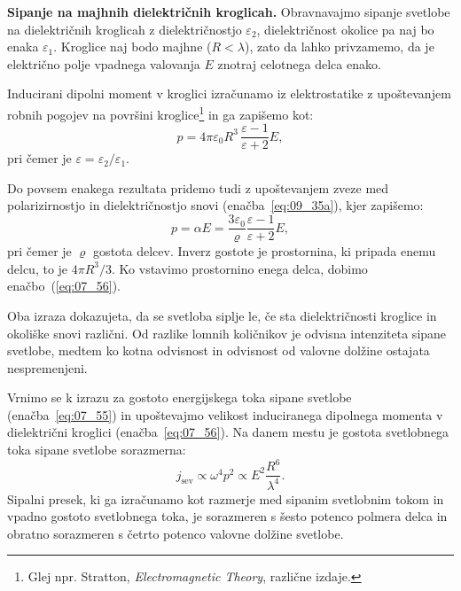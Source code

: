 \begin{example}{\bf Sipanje na majhnih dielektričnih kroglicah.}
Obravnavajmo sipanje svetlobe na dielektričnih kroglicah z
dielektričnostjo $\varepsilon_2$, dielektričnost 
okolice pa naj bo enaka $\varepsilon_1$. Kroglice naj bodo majhne ($R < \lambda$),
zato da lahko privzamemo, da je električno polje 
vpadnega valovanja $E$ znotraj celotnega delca enako. 

Inducirani dipolni moment v kroglici izračunamo iz 
elektrostatike z upoštevanjem robnih pogojev na površini 
kroglice\footnote{Glej npr. Stratton, {\it Electromagnetic Theory}, različne izdaje.}
in ga zapišemo kot:
\begin{equation}
p = 4 \pi \varepsilon_0 R^3 \,\frac{\varepsilon-1}{\varepsilon +2} E,
\label{eq:07_56}
\end{equation}
pri čemer je $\varepsilon = \varepsilon_2/\varepsilon_1$. 

Do povsem enakega rezultata pridemo tudi z upoštevanjem zveze med polarizirnostjo in 
dielektričnostjo snovi (enačba~\ref{eq:09_35a}), kjer zapišemo:
\begin{equation}
p = \alpha E = \frac{3\varepsilon_0}{\varrho}\frac{\varepsilon-1}{\varepsilon+2}E,
\label{eq:07_57}
\end{equation}
pri čemer je $\varrho$ gostota delcev. Inverz gostote je prostornina, ki pripada
enemu delcu, to je $4\pi R^3/3$. Ko vstavimo prostornino enega delca, dobimo enačbo~(\ref{eq:07_56}).

Oba izraza dokazujeta, da se svetloba siplje le, če sta dielektričnosti 
kroglice in okoliške snovi različni.
Od razlike lomnih količnikov je odvisna intenziteta sipane svetlobe, medtem ko
kotna odvisnost in odvisnost od valovne dolžine ostajata nespremenjeni.
\end{example}

Vrnimo se k izrazu za gostoto energijskega toka sipane 
svetlobe (enačba~\ref{eq:07_55}) in upoštevajmo velikost induciranega 
dipolnega momenta v dielektrični kroglici (enačba~\ref{eq:07_56}). Na danem
mestu je gostota svetlobnega toka sipane svetlobe sorazmerna:
\begin{equation}
j_\mathrm{sev} \propto \omega^4 p^2 \propto E^2 \frac{R^6}{\lambda^4}.
\label{eq:07_17}
\end{equation}
Sipalni presek, ki ga izračunamo kot razmerje med sipanim svetlobnim tokom in
vpadno gostoto svetlobnega toka, je sorazmeren s šesto potenco polmera 
delca in obratno sorazmeren s četrto potenco valovne dolžine svetlobe.

